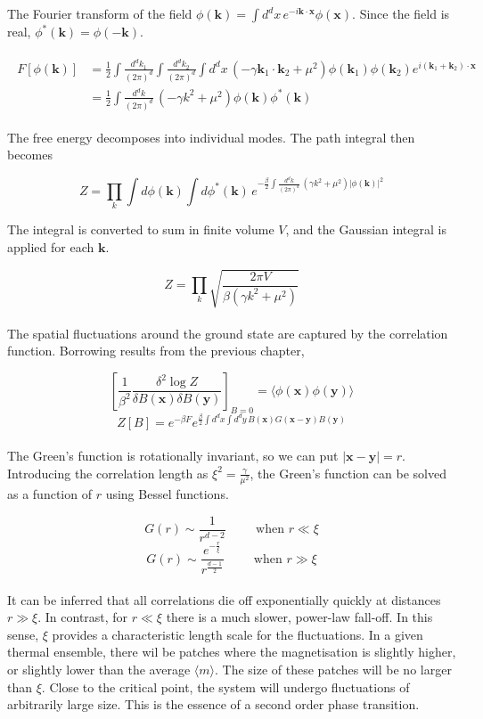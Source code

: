 \noindent The Fourier transform of the field $\phi(\boldsymbol{k})=\int d^dx\, e^{-i\boldsymbol{k}\cdot\boldsymbol{x}}\phi(\boldsymbol{x})$. Since the field is real, $\phi^*(\boldsymbol{k})=\phi(\boldsymbol{-k})$.

\begin{align*}
    \begin{split}
        F[\phi(\boldsymbol{k})]&=\frac{1}{2}\int\frac{d^dk_1}{(2\pi)^d}\int\frac{d^dk_2}{(2\pi)^d}\int d^dx\,(-\gamma\boldsymbol{k}_1\cdot\boldsymbol{k}_2+\mu^2)\phi(\boldsymbol{k}_1)\phi(\boldsymbol{k}_2)e^{i(\boldsymbol{k}_1+\boldsymbol{k}_2)\cdot\boldsymbol{x}}\\
        &=\frac{1}{2}\int\frac{d^dk}{(2\pi)^d}\,(-\gamma k^2+\mu^2)\phi(\boldsymbol{k})\phi^*(\boldsymbol{k})
    \end{split}
\end{align*}

\noindent The free energy decomposes into individual modes. The path integral then becomes

$$Z=\prod_k\int d\phi(\boldsymbol{k})\int d\phi^*(\boldsymbol{k})\,e^{-\frac{\beta}{2}\int\frac{d^dk}{(2\pi)^d}\,(\gamma k^2+\mu^2)|\phi(\boldsymbol{k})|^2}$$

The integral is converted to sum in finite volume $V$, and the Gaussian integral is applied for each $\boldsymbol{k}$.

$$Z=\prod_k\sqrt{\frac{2\pi V}{\beta(\gamma k^2+\mu^2)}}$$\\

\noindent The spatial fluctuations around the ground state are captured by the correlation function. Borrowing results from the previous chapter,

$$\left[\frac{1}{\beta^2}\frac{\delta^2\log Z}{\delta B(\boldsymbol{x})\delta B(\boldsymbol{y})}\right]_{B=0}=\langle\phi(\boldsymbol{x})\phi(\boldsymbol{y})\rangle$$
$$Z[B]=e^{-\beta F}e^{\frac{\beta}{2}\int d^dx\int d^dy\,B(\boldsymbol{x})G(\boldsymbol{x}-\boldsymbol{y})B(\boldsymbol{y})}$$\\

\noindent The Green's function is rotationally invariant, so we can put $|\boldsymbol{x}-\boldsymbol{y}|=r$. Introducing the correlation length as $\xi^2=\frac{\gamma}{\mu^2}$, the Green's function can be solved as a function of $r$ using Bessel functions. 

$$G(r)\sim\frac{1}{r^{d-2}}\hspace{1cm}\text{when }r\ll\xi$$
$$G(r)\sim\frac{e^{-\frac{r}{\xi}}}{r^{\frac{d-1}{2}}}\hspace{1cm}\text{when }r\gg\xi$$\\

\noindent It can be inferred that all correlations die off exponentially quickly at distances $r\gg\xi$. In contrast, for $r\ll\xi$ there is a much slower, power-law fall-off. In this sense, $\xi$ provides a characteristic length scale for the fluctuations. In a given thermal ensemble, there wil be patches where the magnetisation is slightly higher, or slightly lower than the average $\langle m\rangle$. The size of these patches will be no larger than $\xi$. Close to the critical point, the system will undergo fluctuations of arbitrarily large size. This is the essence of a second order phase transition.